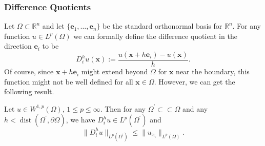 \subsubsection{Difference Quotients}\label{subsec:elliptic-regularity-difference-quotients}

Let $\Omega\subset\mathbb{R}^n$ and let $\{\bm{e}_1,\ldots,\bm{e}_n\}$ be the standard orthonormal basis for $\mathbb{R}^n$. For any function $u\in L^p(\Omega)$ we can formally define the difference quotient in the direction $\bm{e}_i$ to be
\begin{equation}\label{eq:coordinate-direction-difference-quotient-definition}
D_i^hu(\bm{x}):=\frac{u(\bm{x}+h\bm{e}_i)-u(\bm{x})}{h}.
\end{equation}
Of course, since $\bm{x}+h\bm{e}_i$ might extend beyond $\Omega$ for $\bm{x}$ near the boundary, this function might not be well defined for all $\bm{x}\in\Omega$. However, we can get the following result.

\begin{Lemma}
\label{lem:difference-quotient-weak-derivative-bound}
Let $u\in W^{1,p}(\Omega)$, $1\leq p\leq\infty$. Then for any $\Omega^{\prime}\subset\subset\Omega$ and any $h<\operatorname{dist}(\Omega^{\prime},\partial\Omega)$, we have $D_i^hu\in L^p(\Omega^{\prime})$ and
\begin{equation}\label{eq:difference-quotient-bound-by-weak-derivative}
\|D_i^hu\|_{L^p(\Omega^{\prime})}\leq\|u_{x_i}\|_{L^p(\Omega)}.
\end{equation}

\end{Lemma}

